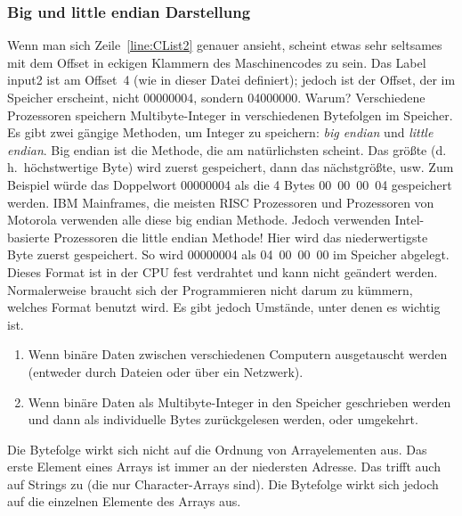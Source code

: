 {\subsubsection{Big und little endian Darstellung }
Wenn man sich Zeile~\ref{line:CList2} genauer ansieht, scheint etwas
sehr seltsames mit dem Offset in eckigen Klammern des Maschinencodes
zu sein. Das Label {\code input2} ist am Offset~4 (wie in dieser
Datei definiert); jedoch ist der Offset, der im Speicher erscheint,
nicht 00000004, sondern 04000000. Warum? Verschiedene Prozessoren
speichern Multibyte-Integer in verschiedenen Bytefolgen im Speicher.
Es gibt zwei g\"{a}ngige Methoden, um Integer zu speichern: \emph{big
endian} und \emph{little endian}.  Big endian ist die Methode, die am
nat\"{u}rlichsten scheint. Das gr\"{o}{\ss}te (d.\,h.\ h\"{o}chstwertige Byte) wird
zuerst gespeichert, dann das n\"{a}chstgr\"{o}{\ss}te, usw. Zum Beispiel w\"{u}rde
das Doppelwort 00000004 als die 4 Bytes 00~00~00~04 gespeichert
werden. IBM Mainframes, die meisten RISC Prozessoren und Prozessoren
von Motorola verwenden alle diese big endian Methode. Jedoch
verwenden Intel-basierte Prozessoren die little endian Methode! Hier
wird das niederwertigste Byte zuerst gespeichert. So wird 00000004
als 04~00~00~00 im Speicher abgelegt. Dieses Format ist in der CPU
fest verdrahtet und kann nicht ge\"{a}ndert werden. Normalerweise
braucht sich der Programmieren nicht darum zu k\"{u}mmern, welches
Format benutzt wird. Es gibt jedoch Umst\"{a}nde, unter denen es wichtig
ist.
\begin{enumerate}
\parskip=-0.20em %

\item
Wenn bin\"{a}re Daten zwischen verschiedenen Computern ausgetauscht
werden (entweder durch Dateien oder \"{u}ber ein Netzwerk).

\item
Wenn bin\"{a}re Daten als Multibyte-Integer in den Speicher geschrieben
werden und dann als individuelle Bytes zur\"{u}ckgelesen werden, oder
umgekehrt.
\end{enumerate}

Die Bytefolge wirkt sich nicht auf die Ordnung von Arrayelementen
aus. Das erste Element eines Arrays ist immer an der niedersten
Adresse. Das trifft auch auf Strings zu (die nur Character-Arrays
sind). Die Bytefolge wirkt sich jedoch auf die einzelnen Elemente
des Arrays aus. 

}
